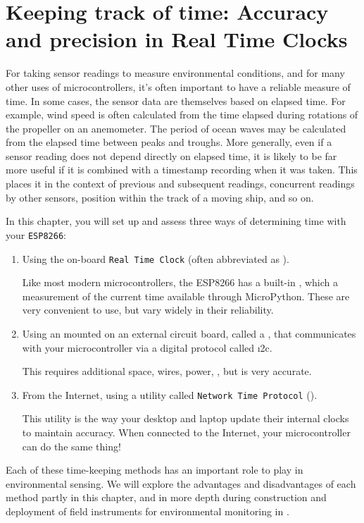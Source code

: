 \setchapterpreamble[u]{\margintoc}
\chapter{Keeping track of time: Accuracy and precision in Real Time Clocks}

For taking sensor readings to measure environmental conditions, and for many other uses of microcontrollers, it’s often important to have a reliable measure of time. 
In some cases, the sensor data are themselves based on elapsed time.
For example, wind speed is often calculated from the time elapsed during rotations of the propeller on an anemometer. 
The period of ocean waves may be calculated from the elapsed time between peaks and troughs. 
More generally, even if a sensor reading does not depend directly on elapsed time, it is likely to be far more useful if it is combined with a timestamp recording when it was taken. 
This places it in the context of previous and subsequent readings, concurrent readings by other sensors, position within the track of a moving ship, and so on.


In this chapter, you will set up and assess three ways of determining time with your \texttt{ESP8266}:
\begin{enumerate}
	\item Using the on-board \texttt{Real Time Clock} (often abbreviated as \rtc). 
	
	\smallskip
	Like most modern microcontrollers, the ESP8266 has a built-in \rtc, which a measurement of the current time available through MicroPython. 
	These are very convenient to use, but vary widely in their reliability.

	\item Using an \rtc mounted on an external circuit board, called a , that communicates with your microcontroller via a digital protocol called \i2c. 
	
	\smallskip
	This requires additional space, wires, power, \etc, but is very accurate. 

	\item From the Internet, using a utility called \texttt{Network Time Protocol} (\ntp). 
		
	\smallskip	
	This utility is the way your desktop and laptop update their internal clocks to maintain accuracy. 
	When connected to the Internet, your microcontroller can do the same thing!
\end{enumerate}
Each of these time-keeping methods has an important role to play in environmental sensing. 
We will explore the advantages and disadvantages of each method partly in this chapter, and in more depth during construction and deployment of field instruments for environmental monitoring in .

